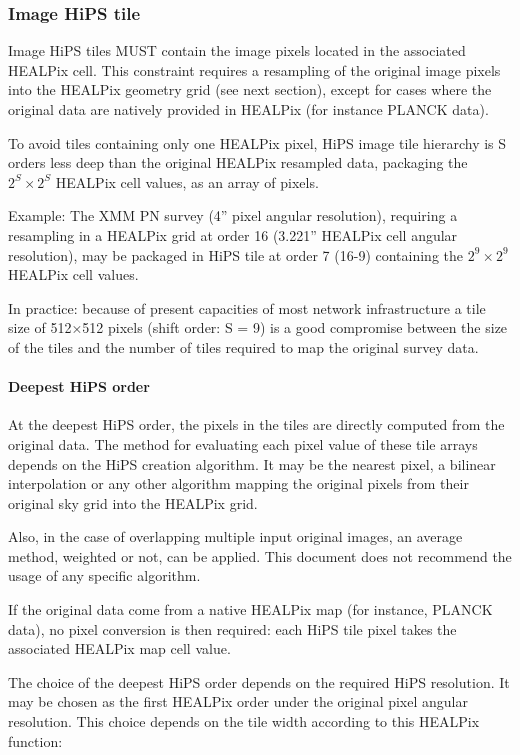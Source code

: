 \documentclass[11pt,a4paper]{ivoa}
\begin{document}
\subsubsection{Image HiPS tile}

Image HiPS tiles MUST contain the image pixels located in the associated HEALPix cell. This constraint requires a resampling of the original image pixels into the HEALPix geometry grid (see next section), except for cases where the original data are natively provided in HEALPix (for instance PLANCK data). 

To avoid tiles containing only one HEALPix pixel, HiPS image tile hierarchy is S orders less deep than the original HEALPix resampled data, packaging the $2^S \times 2^S$ HEALPix cell values, as an array of pixels. 

Example: The XMM PN survey (4'' pixel angular resolution), requiring a resampling in a HEALPix grid at order 16 (3.221'' HEALPix cell angular resolution), may be packaged in HiPS tile at order 7 (16-9) containing the $2^9 \times 2^9$ HEALPix cell values.

In practice: because of present capacities of most network infrastructure a tile size of 512×512 pixels (shift order: S = 9) is a good compromise between the size of the tiles and the number of tiles required to map the original survey data.

\paragraph{Deepest HiPS order}

At the deepest HiPS order, the pixels in the tiles are directly computed from the original data. The method for evaluating each pixel value of these tile arrays depends on the HiPS creation algorithm. It may be the nearest pixel, a bilinear interpolation or any other algorithm mapping the original pixels from their original sky grid into the HEALPix grid.

Also, in the case of overlapping multiple input original images, an average method, weighted or not, can be applied. This document does not recommend the usage of any specific algorithm.

If the original data come from a native HEALPix map (for instance, PLANCK data), no pixel conversion is then required: each HiPS tile pixel takes the associated HEALPix map cell value.

The choice of the deepest HiPS order depends on the required HiPS resolution. It may be chosen as the first HEALPix order under the original pixel angular resolution. This choice depends on the tile width according to this HEALPix function: 
\end{document}
